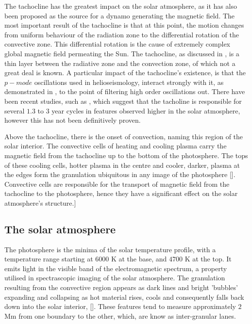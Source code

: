The tachocline has the greatest impact on the solar atmosphere, as it has also been proposed as the source for a dynamo generating the magnetic field.
The most important result of the tachocline is that at this point, the motion changes from uniform behaviour of the radiation zone to the differential rotation of the convective zone.
This differential rotation is the cause of extremely complex global magnetic field permeating the Sun.
The tachocline, as discussed in \cite{Brun2001}, is a thin layer between the radiative zone and the convection zone, of which not a great deal is known.
A particular impact of the tachocline's existence, is that the $p-mode$ oscillations used in helioseismology, interact strongly with it, as demonstrated in \cite{Chaplin2014}, to the point of filtering high order oscillations out.
There have been recent studies, such as \cite{Obridko2007}, which suggest that the tacholine is responsible for several $1.3$ to $3$ year cycles in features observed higher in the solar atmosphere, however this has not been definitively proven.

Above the tachocline, there is the onset of convection, naming this region of the solar interior.
The convective cells of heating and cooling plasma carry the magnetic field from the tachocline up to the bottom of the photosphere.
The tops of these cooling cells, hotter plasma in the centre and cooler, darker, plasma at the edges form the granulation ubiquitous in any image of the photosphere [\cite{Nordlund2009}].
Convective cells are responsible for the transport of magnetic field from the tachocline to the photosphere, hence they have a significant effect on the solar atmosphere's structure.]


\subsection{The solar atmosphere}
The photosphere is the minima of the solar temperature profile, with a temperature range starting at $6000$ K at the base, and $4700$ K at the top.
It emits light in the visible band of the electromagnetic spectrum, a property utilised in spectrascopic imaging of the solar atmosphere.
The granulation resulting from the convective region appears as dark lines and bright 'bubbles' expanding and collapsing as hot material rises, cools and consequently falls back down into the solar interior, [\cite{Nordlund2009}].
These features tend to measure approximately $2$ Mm from one boundary to the other, which, are know as inter-granular lanes.

